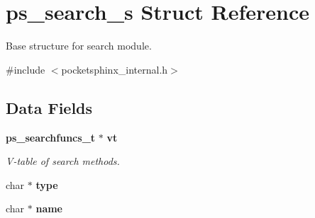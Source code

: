 \section{ps\+\_\+search\+\_\+s Struct Reference}
\label{structps__search__s}


Base structure for search module.  




{\ttfamily \#include $<$pocketsphinx\+\_\+internal.\+h$>$}

\subsection*{Data Fields}
\begin{DoxyCompactItemize}
\item 
{\bf ps\+\_\+searchfuncs\+\_\+t} $\ast$ {\bf vt}
\begin{DoxyCompactList}\small\item\em V-\/table of search methods. \end{DoxyCompactList}\item 
char $\ast$ {\bfseries type}\label{structps__search__s_a2f3a776232b9cc164924c415e6199eec}

\item 
char $\ast$ {\bfseries name}\label{structps__search__s_ab2f99873dc24cee2cdfe9068d41f3617}


\end{DoxyCompactItemize}
